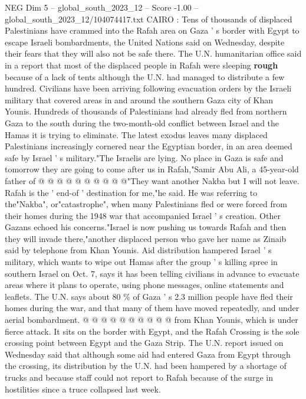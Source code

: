 \begin{textsample}{NEG Dim 5 – global\_south\_2023\_12 – Score -1.00 – global\_south\_2023\_12/104074417.txt}  \label{ex:f5_neg_351}
CAIRO : Tens of thousands of displaced Palestinians have crammed into the Rafah area on Gaza ' s border with Egypt to escape Israeli bombardments, the United Nations said on Wednesday, despite their fears that they will also not be safe there.
The U.N. humanitarian office said in a report that most of the displaced people in Rafah were sleeping \textbf{rough} because of a lack of tents although the U.N. had managed to distribute a few hundred.
Civilians have been arriving following evacuation orders by the Israeli military that covered areas in and around the southern Gaza city of Khan Younis.
Hundreds of thousands of Palestinians had already fled from northern Gaza to the south during the two-month-old conflict between Israel and the Hamas it is trying to eliminate.
The latest exodus leaves many displaced Palestinians increasingly cornered near the Egyptian border, in an area deemed safe by Israel ' s military."The Israelis are lying.
No place in Gaza is safe and tomorrow they are going to come after us in Rafah,"Samir Abu Ali, a 45-year-old father of @ @ @ @ @ @ @ @ @ @"They want another Nakba but I will not leave.
Rafah is the ' end-of ' destination for me,"he said.
He was referring to the"Nakba", or"catastrophe", when many Palestinians fled or were forced from their homes during the 1948 war that accompanied Israel ' s creation.
Other Gazans echoed his concerns."Israel is now pushing us towards Rafah and then they will invade there,"another displaced person who gave her name as Zinaib said by telephone from Khan Younis.
Aid distribution hampered Israel ' s military, which wants to wipe out Hamas after the group ' s killing spree in southern Israel on Oct. 7, says it has been telling civilians in advance to evacuate areas where it plans to operate, using phone messages, online statements and leaflets.
The U.N. says about 80 \% of Gaza ' s 2.3 million people have fled their homes during the war, and that many of them have moved repeatedly, and under aerial bombardment. @ @ @ @ @ @ @ @ @ @ from Khan Younis, which is under fierce attack.
It sits on the border with Egypt, and the Rafah Crossing is the sole crossing point between Egypt and the Gaza Strip.
The U.N. report issued on Wednesday said that although some aid had entered Gaza from Egypt through the crossing, its distribution by the U.N. had been hampered by a shortage of trucks and because staff could not report to Rafah because of the surge in hostilities since a truce collapsed last week.

\end{textsample}

